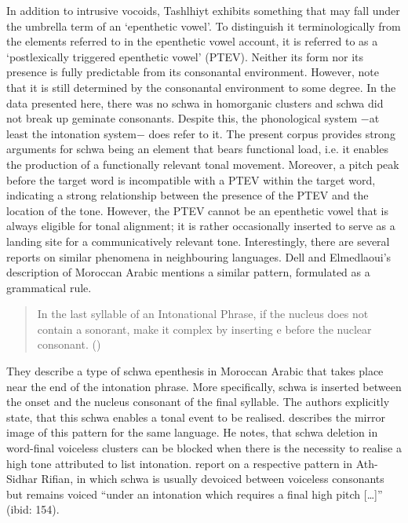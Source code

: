 In addition to intrusive vocoids, Tashlhiyt exhibits something that may fall under the umbrella term of an ‘epenthetic vowel’. To distinguish it terminologically from the elements referred to in the epenthetic vowel account, it is referred to as a ‘postlexically triggered epenthetic vowel’ (PTEV). Neither its form nor its presence is fully predictable from its consonantal environment. However, note that it is still determined by the consonantal environment to some degree. In the data presented here, there was no schwa in homorganic clusters and schwa did not break up geminate consonants. Despite this, the phonological system −at least the intonation system− does refer to it. The present corpus provides strong arguments for schwa being an element that bears functional load, i.e. it enables the production of a functionally relevant tonal movement. Moreover, a pitch peak before the target word is incompatible with a PTEV within the target word, indicating a strong relationship between the presence of the PTEV and the location of the tone. However, the PTEV cannot be an epenthetic vowel that is always eligible for tonal alignment; it is rather occasionally inserted to serve as a landing site for a communicatively relevant tone. Interestingly, there are several reports on similar phenomena in neighbouring languages. Dell and Elmedlaoui’s description of Moroccan Arabic mentions a similar pattern, formulated as a grammatical rule. 
 
\begin{quote}
In the last syllable of an Intonational Phrase, if the nucleus does not contain a sonorant, make it complex by inserting e before the nuclear consonant. (\citealt[300]{DE2002})
\end{quote}

They describe a type of schwa epenthesis in Moroccan Arabic that takes place near the end of the intonation phrase. More specifically, schwa is inserted between the onset and the nucleus consonant of the final syllable. The authors explicitly state, that this schwa enables a tonal event to be realised. \citet[184]{Heath1987} describes the mirror image of this pattern for the same language. He notes, that schwa deletion in word-final voiceless clusters can be blocked when there is the necessity to realise a high tone attributed to list intonation. \citet{DellTangi1992} report on a respective pattern in Ath-Sidhar Rifian, in which schwa is usually devoiced between voiceless consonants but remains voiced “under an intonation which requires a final high pitch […]” (ibid: 154).

